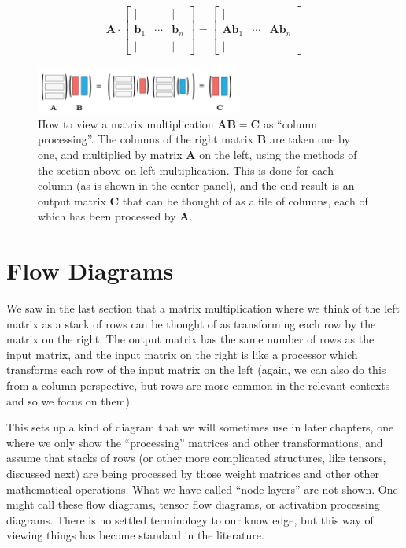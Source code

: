 \begin{align*}
\mathbf{A} \cdot
\begin{bmatrix}
\vert &        & \vert \\
\mathbf{b}_1 & \cdots & \mathbf{b}_n \\
\vert &        & \vert
\end{bmatrix}
=
\begin{bmatrix}
\vert &        & \vert \\
\mathbf{A} \mathbf{b}_1 & \cdots & \mathbf{A} \mathbf{b}_n \\
\vert &        & \vert
\end{bmatrix}
\end{align*}

\begin{figure}[h]
\centering
\includegraphics[width=0.6\textwidth]{images/columnPerspective.png}
\caption[Jeff Yoshimi.]{How to view a matrix multiplication  $\mathbf{A}\mathbf{B} = \mathbf{C}$ as ``column processing''. The columns of the right matrix $\mathbf{B}$ are taken one by one, and multiplied by matrix $\mathbf{A}$  on the left, using the methods of the section above on left multiplication. This is done for each column (as is shown in the center panel), and the end result is an output matrix $\mathbf{C}$ that can be thought of as a file of columns, each of which has been processed by $\mathbf{A}$.}
\label{columnPerspective}
\end{figure} 

\section{Flow Diagrams }\label{flowDiagrams}

 We saw in the last section that a matrix multiplication where we think of the left matrix as a stack of rows can be thought of as transforming each row by the matrix on the right. The output matrix has the same number of rows as the input matrix, and the input matrix on the right is like a processor which transforms each row of the input matrix on the left (again, we can also do this from a column perspective, but rows are more common in the relevant contexts and so we focus on them). 

This sets up a kind of diagram that we will sometimes use in later chapters, one where we only show the ``processing'' matrices and other transformations, and assume that stacks of rows (or other more complicated structures, like tensors, discussed next) are being processed by those weight matrices and other other mathematical operations. What we have called ``node layers'' are not shown. One might call these flow diagrams, tensor flow diagrams, or activation processing diagrams. There is no settled terminology to our knowledge, but this way of viewing things has become standard in the literature.

